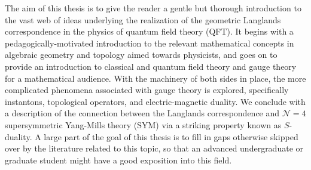 The aim of this thesis is to give the reader a gentle but thorough introduction to the vast web of ideas underlying the realization of the geometric Langlands correspondence in the physics of quantum field theory (QFT). It begins with a pedagogically-motivated introduction to the relevant mathematical concepts in algebraic geometry and topology aimed towards physicists, and goes on to provide an introduction to classical and quantum field theory and gauge theory for a mathematical audience. With the machinery of both sides in place, the more complicated phenomena associated with gauge theory is explored, specifically instantons, topological operators, and electric-magnetic duality. We conclude with a description of the connection between the Langlands correspondence and $\mathcal N = 4$ supersymmetric Yang-Mills theory (SYM) via a striking property known as $S$-duality. A large part of the goal of this thesis is to fill in gaps otherwise skipped over by the literature related to this topic, so that an advanced undergraduate or graduate student might have a good exposition into this field. 